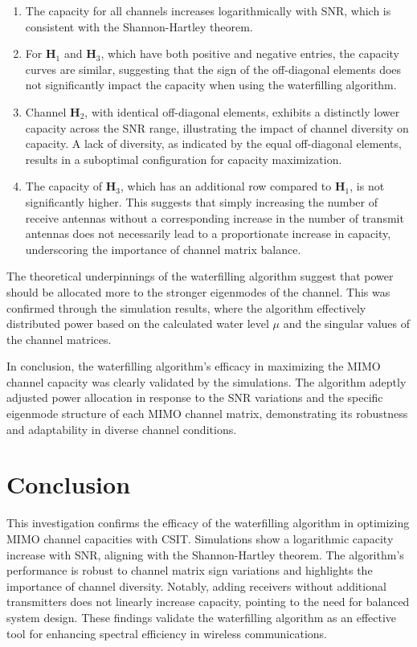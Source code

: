 \documentclass[lettersize,journal]{IEEEtran}
\begin{document}
\begin{enumerate}
    \item The capacity for all channels increases logarithmically with SNR, which is consistent with the Shannon-Hartley theorem. 
    \item For \( \mathbf{H}_1 \) and \( \mathbf{H}_3 \), which have both positive and negative entries, the capacity curves are similar, suggesting that the sign of the off-diagonal elements does not significantly impact the capacity when using the waterfilling algorithm.
    \item Channel \( \mathbf{H}_2 \), with identical off-diagonal elements, exhibits a distinctly lower capacity across the SNR range, illustrating the impact of channel diversity on capacity. A lack of diversity, as indicated by the equal off-diagonal elements, results in a suboptimal configuration for capacity maximization.
    \item The capacity of \( \mathbf{H}_3 \), which has an additional row compared to \( \mathbf{H}_1 \), is not significantly higher. This suggests that simply increasing the number of receive antennas without a corresponding increase in the number of transmit antennas does not necessarily lead to a proportionate increase in capacity, underscoring the importance of channel matrix balance.
\end{enumerate}

The theoretical underpinnings of the waterfilling algorithm suggest that power should be allocated more to the stronger eigenmodes of the channel. This was confirmed through the simulation results, where the algorithm effectively distributed power based on the calculated water level \( \mu \) and the singular values of the channel matrices.

In conclusion, the waterfilling algorithm's efficacy in maximizing the MIMO channel capacity was clearly validated by the simulations. The algorithm adeptly adjusted power allocation in response to the SNR variations and the specific eigenmode structure of each MIMO channel matrix, demonstrating its robustness and adaptability in diverse channel conditions.

\section{Conclusion}

This investigation confirms the efficacy of the waterfilling algorithm in optimizing MIMO channel capacities with CSIT. Simulations show a logarithmic capacity increase with SNR, aligning with the Shannon-Hartley theorem. The algorithm's performance is robust to channel matrix sign variations and highlights the importance of channel diversity. Notably, adding receivers without additional transmitters does not linearly increase capacity, pointing to the need for balanced system design. These findings validate the waterfilling algorithm as an effective tool for enhancing spectral efficiency in wireless communications.
\end{document}
